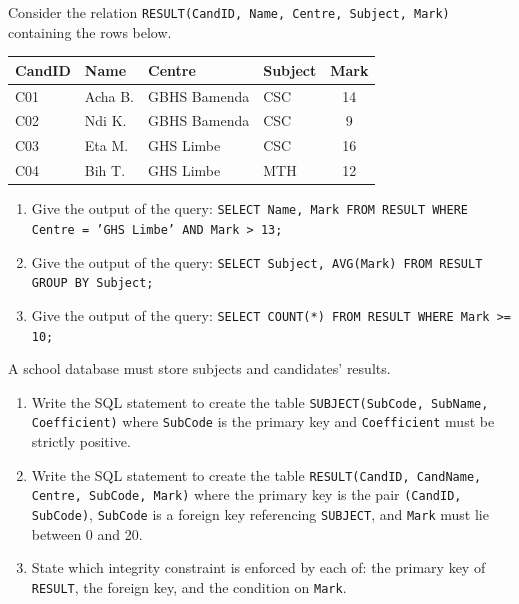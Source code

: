 \documentclass[11pt]{article}
\newcounter{popsec}
\newcounter{popsub}
\newcommand{\courssub}[1]{%
  \stepcounter{popsub}%
  \par\vspace{9pt}\noindent{\popxbold\fontsize{11.5}{13}\selectfont\color{popink}{\color{poporange}\thepopsec.\thepopsub}\hspace{6pt}#1}\par\nopagebreak\vspace{4pt}
}
\begin{document}
\begin{exercice}
Consider the relation \texttt{RESULT(CandID, Name, Centre, Subject, Mark)} containing the rows below.

\begin{center}
\begin{tabular}{|l|l|l|l|c|}
\hline
\rowcolor{popblueL} \textbf{CandID} & \textbf{Name} & \textbf{Centre} & \textbf{Subject} & \textbf{Mark} \\
\hline
C01 & Acha B. & GBHS Bamenda & CSC & 14 \\
\hline
C02 & Ndi K. & GBHS Bamenda & CSC & 9 \\
\hline
C03 & Eta M. & GHS Limbe & CSC & 16 \\
\hline
C04 & Bih T. & GHS Limbe & MTH & 12 \\
\hline
\end{tabular}
\end{center}

\begin{enumerate}
\item Give the output of the query: \texttt{SELECT Name, Mark FROM RESULT WHERE Centre = 'GHS Limbe' AND Mark > 13;}
\item Give the output of the query: \texttt{SELECT Subject, AVG(Mark) FROM RESULT GROUP BY Subject;}
\item Give the output of the query: \texttt{SELECT COUNT(*) FROM RESULT WHERE Mark >= 10;}
\end{enumerate}
\end{exercice}

\courssub{I practise}

\begin{exercice}
A school database must store subjects and candidates' results.
\begin{enumerate}
\item Write the SQL statement to create the table \texttt{SUBJECT(SubCode, SubName, Coefficient)} where \texttt{SubCode} is the primary key and \texttt{Coefficient} must be strictly positive.
\item Write the SQL statement to create the table \texttt{RESULT(CandID, CandName, Centre, SubCode, Mark)} where the primary key is the pair \texttt{(CandID, SubCode)}, \texttt{SubCode} is a foreign key referencing \texttt{SUBJECT}, and \texttt{Mark} must lie between 0 and 20.
\item State which integrity constraint is enforced by each of: the primary key of \texttt{RESULT}, the foreign key, and the condition on \texttt{Mark}.
\end{enumerate}
\end{exercice}
\end{document}
